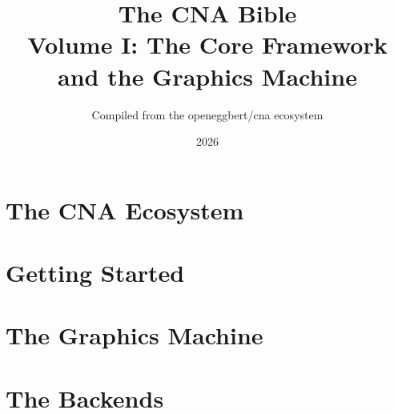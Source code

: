 \documentclass[11pt,twoside,openright]{book}
\title{The CNA Bible \\ \Large Volume I: The Core Framework and the Graphics Machine}
\author{Compiled from the openeggbert/cna ecosystem}
\date{2026}
\begin{document}
\frontmatter


\tableofcontents

\mainmatter

\part{The CNA Ecosystem}




\part{Getting Started}






\part{The Graphics Machine}








\part{The Backends}










\appendix


\backmatter
\printindex
\end{document}
